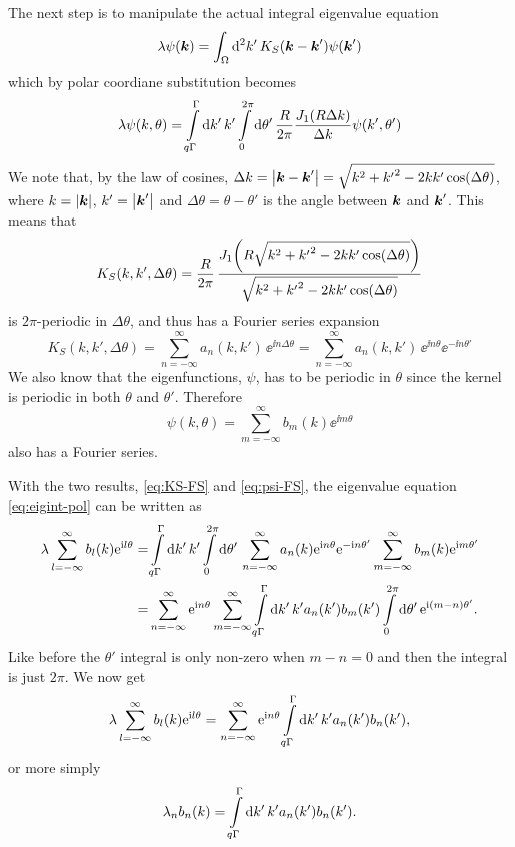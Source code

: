\documentclass[11pt,a4paper, 
english, swedish %
]{article}
\begin{document}
The next step is to manipulate the actual integral eigenvalue equation
\begin{equation}
\lambda \psi(\vb*k) = \oldint_\Omega \rd^2k'\,
K_S(\vb*k-\vb*k')\psi(\vb*k')
\end{equation}
which by polar coordiane substitution becomes
\begin{equation}\label{eq:eigint-pol}
\lambda\psi(k, \theta) =
\int_{q\Gamma}^\Gamma\rd{k'}\,k'
\int_{0}^{2\pi}\rd\theta'\,\frac{R}{2\pi}
\frac{J_1(R\Delta{k})}{\Delta{k}} \psi(k',\theta')
\end{equation}
We note that, by the law of cosines, 
$\Delta{k}=\abs{\vb*k-\vb*k'}=\sqrt{k^2+{k'}^2-2kk'\cos(\Delta\theta)}$, 
where $k=\abs{\vb*k}$, $k'=\abs{\vb*k'}$ and
$\Delta\theta=\theta-\theta'$ is the angle between $\vb*k$ and
$\vb*k'$. This means that 
\begin{equation}\label{eq:KS-long}
K_S(k, k', \Delta\theta) = \frac{R}{2\pi}\,
\frac{J_1\qty(R\sqrt{k^2+{k'}^2-2kk'\cos(\Delta\theta)})}
{\sqrt{k^2+{k'}^2-2kk'\cos(\Delta\theta)}}
\end{equation}
is $2\pi$-periodic in $\Delta\theta$, and thus has a Fourier series expansion 
\begin{equation} \label{eq:KS-FS}
K_S(k, k', \Delta\theta)  
=\sum_{n=-\infty}^\infty a_{n}(k, k')\, \ee^{\ii n\Delta\theta}
=\sum_{n=-\infty}^\infty a_{n}(k, k')\, \ee^{\ii n\theta}\ee^{-\ii n\theta'}
\end{equation}
We also know that the eigenfunctions, $\psi$, has to be periodic in
$\theta$ since the kernel is periodic in both $\theta$ and
$\theta'$. Therefore 
\begin{equation}\label{eq:psi-FS}
\psi(k, \theta) = \sum_{m=-\infty}^\infty b_m(k)\ee^{\ii m\theta}
\end{equation}
also has a Fourier series. 

With the two results, \eqref{eq:KS-FS} and \eqref{eq:psi-FS}, the
eigenvalue equation \eqref{eq:eigint-pol} can be written as
\begin{equation}
\begin{aligned}
\lambda\sum_{l=-\infty}^\infty b_l(k)\ee^{\ii l\theta}
=& \int_{q\Gamma}^\Gamma\rd{k'}\,k'\int_{0}^{2\pi}\rd\theta'\,
\sum_{n=-\infty}^\infty a_n(k)\ee^{\ii n\theta}\ee^{-\ii n\theta'}
\sum_{m=-\infty}^\infty b_m(k)\ee^{\ii m\theta'}\\
=& \sum_{n=-\infty}^\infty \ee^{\ii n\theta} \sum_{m=-\infty}^\infty 
\int_{q\Gamma}^\Gamma\rd{k'}\,k' a_n(k') b_m(k')
\int_{0}^{2\pi}\rd\theta'\,
\ee^{\ii (m-n)\theta'}.
\end{aligned}
\end{equation}
Like before the $\theta'$ integral is only non-zero when $m-n=0$ and
then the integral is just $2\pi$. We now get
\begin{equation}
\lambda\sum_{l=-\infty}^\infty b_l(k)\ee^{\ii l\theta}
= \sum_{n=-\infty}^\infty \ee^{\ii n\theta} 
\int_{q\Gamma}^\Gamma\rd{k'}\,k' a_n(k') b_n(k'),
\end{equation}
or more simply
\begin{equation}
\lambda_n b_n(k) = \int_{q\Gamma}^\Gamma\rd{k'}\,k' a_n(k') b_n(k').
\end{equation}
\end{document}
